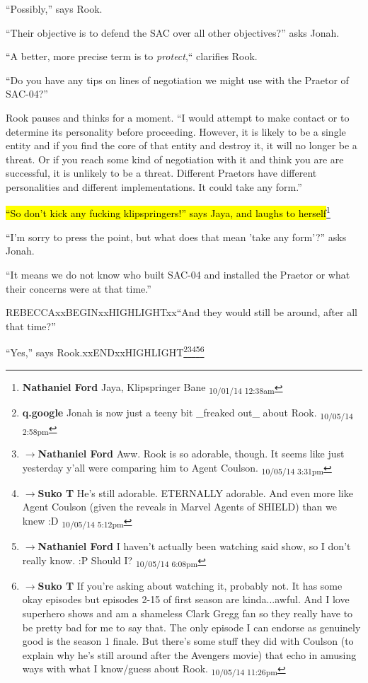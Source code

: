 ``Possibly,'' says Rook.

``Their objective is to defend the SAC over all other objectives?'' asks Jonah.

``A better, more precise term is to \textit{protect},`` clarifies Rook.

``Do you have any tips on lines of negotiation we might use with the Praetor of SAC-04?''

Rook pauses and thinks for a moment.  ``I would attempt to make contact or to determine its personality before proceeding.  However, it is likely to be a single entity and if you find the core of that entity and destroy it, it will no longer be a threat.  Or if you reach some kind of negotiation with it and think you are are successful, it is unlikely to be a threat.  Different Praetors have different personalities and different implementations.  It could take any form.''

\hl{``So don't kick any fucking klipspringers!'' says Jaya, and laughs to herself}\footnote{\textbf{Nathaniel Ford }Jaya, Klipspringer Bane \textsubscript{10/01/14 12:38am}}

``I'm sorry to press the point, but what does that mean 'take any form'?'' asks Jonah.

``It means we do not know who built SAC-04 and installed the Praetor or what their concerns were at that time.''

REBECCAxxBEGINxxHIGHLIGHTxx``And they would still be around, after all that time?''

``Yes,'' says Rook.xxENDxxHIGHLIGHT\footnote{\textbf{q.google }Jonah is now just a teeny bit \_freaked out\_ about Rook. \textsubscript{10/05/14 2:58pm}}\footnote{$\rightarrow$\textbf{Nathaniel Ford }Aww. Rook is so adorable, though. It seems like just yesterday y'all were comparing him to Agent Coulson. \textsubscript{10/05/14 3:31pm}}\footnote{$\rightarrow$\textbf{Suko T }He's still adorable.  ETERNALLY adorable.  And even more like Agent Coulson (given the reveals in Marvel Agents of SHIELD) than we knew :D \textsubscript{10/05/14 5:12pm}}\footnote{$\rightarrow$\textbf{Nathaniel Ford }I haven't actually been watching said show, so I don't really know. :P Should I? \textsubscript{10/05/14 6:08pm}}\footnote{$\rightarrow$\textbf{Suko T }If you're asking about watching it, probably not. It has some okay episodes but episodes 2-15 of first season are kinda...awful.  And I love superhero shows and am a shameless Clark Gregg fan so they really have to be pretty bad for me to say that.  The only episode I can endorse as genuinely good is the season 1 finale.  But there's some stuff they did with Coulson (to explain why he's still around after the Avengers movie) that echo in amusing ways with what I know/guess about Rook. \textsubscript{10/05/14 11:26pm}}

